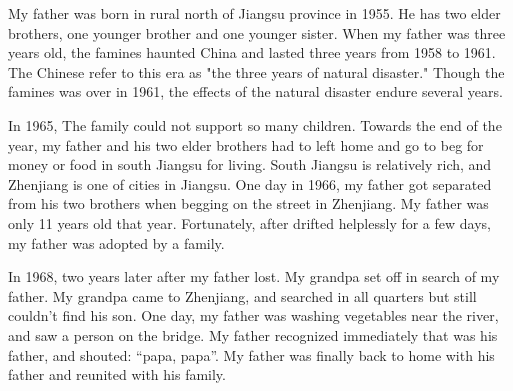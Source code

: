 \documentclass[12pt,a4paper]{caspset}
\begin{document}

My father was born in rural north of Jiangsu province in 1955. He has two elder brothers, one younger brother  and one younger sister.  When my father was three years old, the famines haunted China and lasted three years from 1958 to 1961. The Chinese refer to this era as "the three years of natural disaster." Though the famines was over in 1961, the effects of the natural disaster endure several years. 

In 1965, The family could not support so many children. Towards the end of the year, my father and his two elder brothers had to left home and go to beg for money or food in south Jiangsu for living. South Jiangsu is relatively rich, and Zhenjiang is one of cities in Jiangsu. One day in 1966, my father got separated from his two brothers when begging on the street in Zhenjiang. My father was only 11 years old that year. Fortunately, after drifted helplessly for a few days, my father was adopted by a family. 

In 1968, two years later after my father lost. My grandpa set off in search of my father.  My grandpa came to Zhenjiang, and searched in all quarters but still couldn't find his son. One day, my father was washing vegetables near the river, and saw a person on the bridge. My father recognized immediately that was his father, and shouted: “papa, papa”.  My father was finally back to home with his father and reunited with his family.
\end{document}
